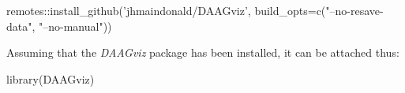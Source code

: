 \begin{fullwidth}

\begin{Schunk}
\begin{Sinput}
remotes::install_github('jhmaindonald/DAAGviz',
                        build_opts=c("--no-resave-data", 
                                     "--no-manual"))
\end{Sinput}
\end{Schunk}

\end{fullwidth}

Assuming that the {\em DAAGviz} package has been installed, it can be attached thus:
\begin{Schunk}
\begin{Sinput}
library(DAAGviz)
\end{Sinput}
\end{Schunk}

